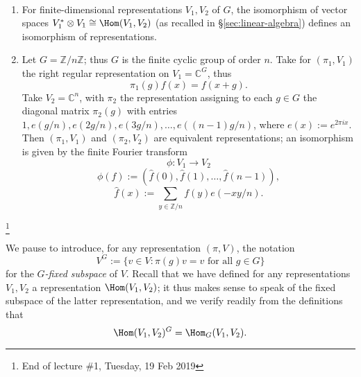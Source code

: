 \documentclass[reqno]{amsart} 
\begin{document}
\begin{example}
~
  \begin{enumerate}
  \item For finite-dimensional representations $V_1, V_2$ of $G$, the isomorphism of vector spaces $V_1^* \otimes V_1 \cong \Hom(V_1,V_2)$ (as recalled in \S\ref{sec:linear-algebra}) defines an isomorphism of representations.
  \item Let $G = \mathbb{Z}/n \mathbb{Z}$; thus $G$ is the finite cyclic group of order $n$.  Take for $(\pi_1,V_1)$ the right regular representation on $V_1 = \mathbb{C}^G$, thus
    \begin{equation*}
      \pi_1(g) f(x) = f(x + g).
    \end{equation*}
    Take $V_2 = \mathbb{C}^n$, with $\pi_2$ the representation assigning to each $g \in G$ the diagonal matrix $\pi_2(g)$ with entries $1, e(g/n), e(2 g/n), e(3 g/n), \dotsc, e((n-1) g/n)$, where $e(x) := e^{2 \pi i x}$.  Then $(\pi_1,V_1)$ and $(\pi_2,V_2)$ are equivalent representations; an isomorphism is given by the finite Fourier transform
    \begin{equation*}
      \phi : V_1 \rightarrow V_2
    \end{equation*}
    \begin{equation*}
      \phi(f) := (\hat{f}(0), \hat{f}(1), \dotsc, \hat{f}(n-1)),
    \end{equation*}
    \begin{equation*}
      \hat{f}(x) := \sum_{y \in \mathbb{Z}/n} f(y) e(-x y/n).
    \end{equation*}
  \end{enumerate}
\end{example}
\footnote{End of lecture \#1, Tuesday, 19 Feb 2019}

We pause to introduce, for any representation $(\pi,V)$, the notation
\begin{equation}\label{eq:}
  V^G :=  \{v \in V : \pi(g) v = v \text{ for all } g \in G\}
\end{equation}
for the \emph{$G$-fixed subspace} of $V$.  Recall that we have defined for any representations $V_1, V_2$ a representation $\Hom(V_1,V_2)$; it thus makes sense to speak of the fixed subspace of the latter representation, and we verify readily from the definitions that
\begin{equation}\label{eq:}
  \Hom(V_1,V_2)^G = \Hom_G(V_1, V_2).
\end{equation}
\end{document}
